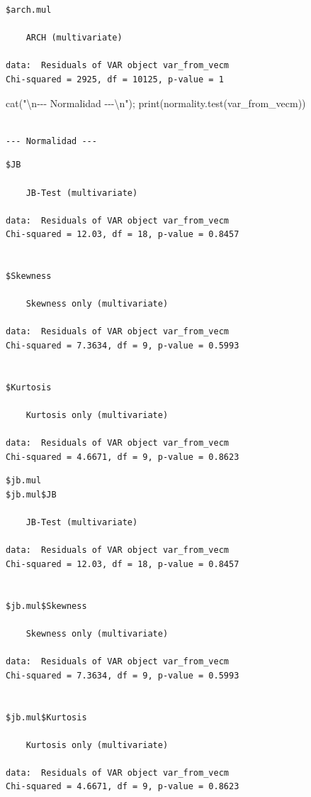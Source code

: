 \documentclass[
  spanish,
  letterpaper,
  DIV=11,
  numbers=noendperiod]{scrartcl}
\newenvironment{Shaded}{\begin{snugshade}}{\end{snugshade}}
\newcommand{\FunctionTok}[1]{\textcolor[rgb]{0.28,0.35,0.67}{#1}}
\newcommand{\NormalTok}[1]{\textcolor[rgb]{0.00,0.23,0.31}{#1}}
\newcommand{\SpecialCharTok}[1]{\textcolor[rgb]{0.37,0.37,0.37}{#1}}
\newcommand{\StringTok}[1]{\textcolor[rgb]{0.13,0.47,0.30}{#1}}
\begin{document}
\begin{verbatim}
$arch.mul

    ARCH (multivariate)

data:  Residuals of VAR object var_from_vecm
Chi-squared = 2925, df = 10125, p-value = 1
\end{verbatim}

\begin{Shaded}
\begin{Highlighting}[]
\FunctionTok{cat}\NormalTok{(}\StringTok{"}\SpecialCharTok{\textbackslash{}n}\StringTok{{-}{-}{-} Normalidad {-}{-}{-}}\SpecialCharTok{\textbackslash{}n}\StringTok{"}\NormalTok{); }\FunctionTok{print}\NormalTok{(}\FunctionTok{normality.test}\NormalTok{(var\_from\_vecm))}
\end{Highlighting}
\end{Shaded}

\begin{verbatim}

--- Normalidad ---
\end{verbatim}

\begin{verbatim}
$JB

    JB-Test (multivariate)

data:  Residuals of VAR object var_from_vecm
Chi-squared = 12.03, df = 18, p-value = 0.8457


$Skewness

    Skewness only (multivariate)

data:  Residuals of VAR object var_from_vecm
Chi-squared = 7.3634, df = 9, p-value = 0.5993


$Kurtosis

    Kurtosis only (multivariate)

data:  Residuals of VAR object var_from_vecm
Chi-squared = 4.6671, df = 9, p-value = 0.8623
\end{verbatim}

\begin{verbatim}
$jb.mul
$jb.mul$JB

    JB-Test (multivariate)

data:  Residuals of VAR object var_from_vecm
Chi-squared = 12.03, df = 18, p-value = 0.8457


$jb.mul$Skewness

    Skewness only (multivariate)

data:  Residuals of VAR object var_from_vecm
Chi-squared = 7.3634, df = 9, p-value = 0.5993


$jb.mul$Kurtosis

    Kurtosis only (multivariate)

data:  Residuals of VAR object var_from_vecm
Chi-squared = 4.6671, df = 9, p-value = 0.8623
\end{verbatim}
\end{document}
